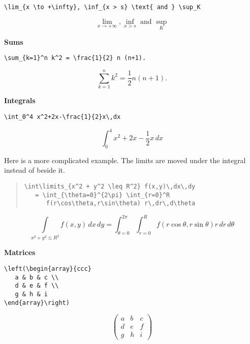 \documentclass[letterpaper,twoside,10pt]{article}
\begin{document}
\begin{multicols}{2}
\small{\begin{verbatim}
\lim_{x \to +\infty}, \inf_{x > s} \text{ and } \sup_K
\end{verbatim}}
\[
\lim_{x \to +\infty}, \inf_{x > s} \text{ and } \sup_K
\]
\end{multicols}

\bigbreak\textbf{Sums}

\begin{multicols}{2}
\small{\begin{verbatim}
\sum_{k=1}^n k^2 = \frac{1}{2} n (n+1).
\end{verbatim}}
\[
\sum_{k=1}^n k^2 = \frac{1}{2} n (n+1).
\]
\end{multicols}

\bigbreak\textbf{Integrals}

\begin{multicols}{2}
\small{\begin{verbatim}
\int_0^4 x^2+2x-\frac{1}{2}x\,dx
\end{verbatim}}
\[
\int_0^4 x^2+2x-\frac{1}{2}x\,dx
\]
\end{multicols}

Here is a more complicated example. The limits are moved under the integral instead of beside it.

\begin{quote}\small
\begin{verbatim}
\int\limits_{x^2 + y^2 \leq R^2} f(x,y)\,dx\,dy
   = \int_{\theta=0}^{2\pi} \int_{r=0}^R
      f(r\cos\theta,r\sin\theta) r\,dr\,d\theta
\end{verbatim}
\end{quote}

\[
\int\limits_{x^2 + y^2 \leq R^2} f(x,y)\,dx\,dy
   = \int_{\theta=0}^{2\pi} \int_{r=0}^R
      f(r\cos\theta,r\sin\theta) r\,dr\,d\theta
\]


\bigbreak\textbf{Matrices}

\begin{multicols}{2}
\small{\begin{verbatim}
\left(\begin{array}{ccc}
   a & b & c \\
   d & e & f \\
   g & h & i
\end{array}\right)
\end{verbatim}}
\[
\left(\begin{array}{ccc}
   a & b & c \\
   d & e & f \\
   g & h & i
\end{array}\right)
\]
\end{multicols}
\end{document}
